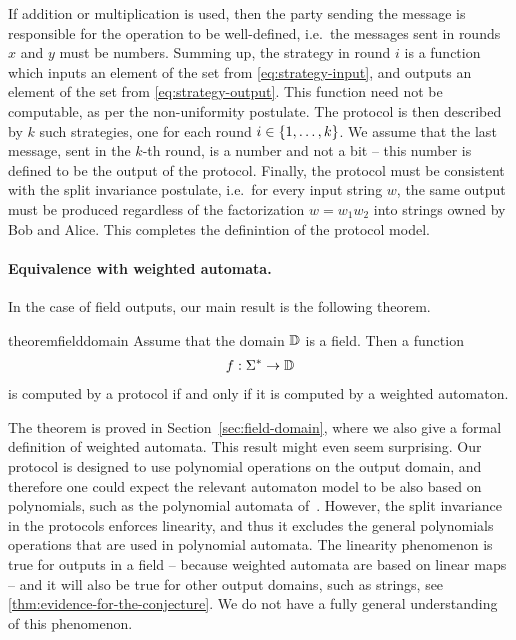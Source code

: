 If addition or multiplication is used, then the party sending the message is responsible for the operation to be well-defined, i.e.~the messages sent in rounds $x$ and $y$ must be numbers.
Summing up, the strategy in round $i$ is a function which inputs an element of the set from \eqref{eq:strategy-input}, and outputs an element of the set from \eqref{eq:strategy-output}. This function need not be computable, as per the non-uniformity postulate. The protocol is then described by $k$ such strategies, one for each round $i \in \{1,\ldots,k\}$. We assume that the last message, sent in the $k$-th round, is a number and not a bit -- this number is defined to be the output of the protocol. 
Finally, the protocol must be consistent with the split invariance postulate, i.e.~for every input string $w$, the same output must be produced regardless of the factorization $w = w_1 w_2$ into strings owned by Bob and Alice. This completes the definintion of the protocol model.


\paragraph*{Equivalence with weighted automata.} In the case of field outputs,  our main result is the following theorem.



\begin{restatable}{theorem}{fielddomain}
    \label{thm:field-domain}
     Assume that the domain $\mathbb D$ is a field. Then a function 
    \begin{align*}
    f : \Sigma^* \to \mathbb D
    \end{align*}  is computed by a protocol if and only if it is  computed by a weighted automaton.
\end{restatable}




The theorem is proved in Section~\ref{sec:field-domain}, where we also give a formal definition of weighted automata.  This result might even seem surprising. Our protocol is designed to use polynomial operations on the output domain, and therefore one could expect the relevant automaton model to be also based on polynomials, such as the  polynomial automata of~\cite{DBLP:conf/lics/BenediktDSW17}. However,  the split invariance in the protocols  enforces linearity, and thus it excludes the general polynomials operations that are used in polynomial automata. The linearity phenomenon is true for outputs in a field -- because weighted automata are based on linear maps -- and it will also be true for other output domains, such as strings, see \cref{thm:evidence-for-the-conjecture}. We do not have a fully general understanding of this phenomenon.

